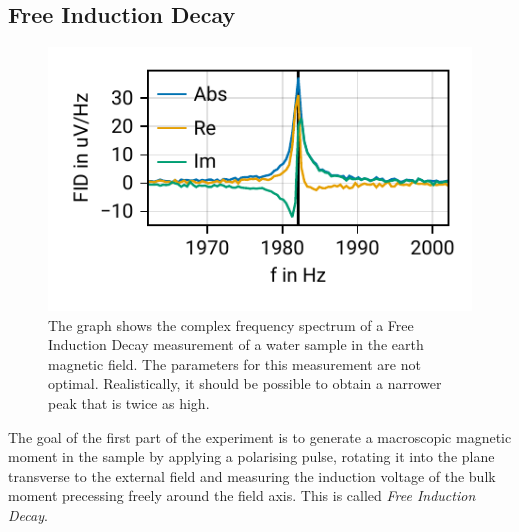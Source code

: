 \documentclass[
    parskip=half, 
    twoside=false,
    twocolumn=true,
    fontsize=11pt,
]{scrarticle}
\begin{document}
\subsection{Free Induction Decay}
\begin{figure}
    \centering
    \label{fig:FID}
    \includegraphics{figures/02 fid.pdf}
    \caption{The graph shows the complex frequency spectrum of a Free Induction Decay measurement of a water sample in the earth magnetic field. The parameters for this measurement are not optimal. Realistically, it should be possible to obtain a narrower peak that is twice as high.}
\end{figure}

The goal of the first part of the experiment is to generate a macroscopic magnetic moment in the sample by applying a polarising pulse, rotating it into the plane transverse to the external field and measuring the induction voltage of the bulk moment precessing freely around the field axis. This is called \textit{Free Induction Decay}.\\
\end{document}
